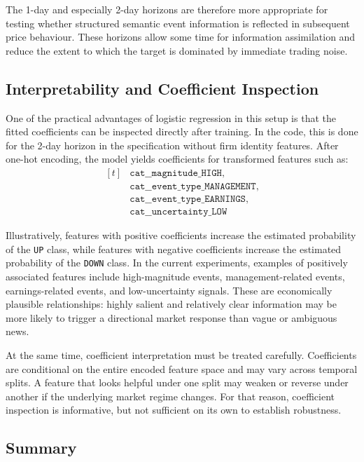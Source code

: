 The 1-day and especially 2-day horizons are therefore more appropriate for testing whether structured semantic event information is reflected in subsequent price behaviour. These horizons allow some time for information assimilation and reduce the extent to which the target is dominated by immediate trading noise.

\subsection{Interpretability and Coefficient Inspection}

One of the practical advantages of logistic regression in this setup is that the fitted coefficients can be inspected directly after training. In the code, this is done for the 2-day horizon in the specification without firm identity features. After one-hot encoding, the model yields coefficients for transformed features such as:
\[
\begin{aligned}[t]
&\texttt{cat\_\_magnitude\_HIGH},\\
&\texttt{cat\_\_event\_type\_MANAGEMENT},\\
&\texttt{cat\_\_event\_type\_EARNINGS},\\
&\texttt{cat\_\_uncertainty\_LOW}
\end{aligned}
\]

Illustratively, features with positive coefficients increase the estimated probability of the \texttt{UP} class, while features with negative coefficients increase the estimated probability of the \texttt{DOWN} class. In the current experiments, examples of positively associated features include high-magnitude events, management-related events, earnings-related events, and low-uncertainty signals. These are economically plausible relationships: highly salient and relatively clear information may be more likely to trigger a directional market response than vague or ambiguous news.

At the same time, coefficient interpretation must be treated carefully. Coefficients are conditional on the entire encoded feature space and may vary across temporal splits. A feature that looks helpful under one split may weaken or reverse under another if the underlying market regime changes. For that reason, coefficient inspection is informative, but not sufficient on its own to establish robustness.

\subsection{Summary}

